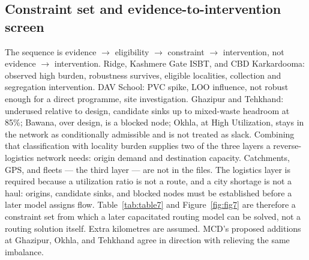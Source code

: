 \documentclass[12pt,a4paper]{article}
\begin{document}
\subsection{Constraint set and evidence-to-intervention screen}
\label{sec:res-routing}

The sequence is evidence $\rightarrow$ eligibility $\rightarrow$ constraint $\rightarrow$ intervention, not evidence $\rightarrow$ intervention. Ridge, Kashmere Gate ISBT, and CBD Karkardooma: observed high burden, robustness survives, eligible localities, collection and segregation intervention. DAV School: PVC spike, LOO influence, not robust enough for a direct programme, site investigation. Ghazipur and Tehkhand: underused relative to design, candidate sinks up to mixed-waste headroom at 85\%; Bawana, over design, is a blocked node; Okhla, at High Utilization, stays in the network as conditionally admissible and is not treated as slack. Combining that classification with locality burden supplies two of the three layers a reverse-logistics network needs: origin demand and destination capacity. Catchments, GPS, and fleets --- the third layer --- are not in the files. The logistics layer is required because a utilization ratio is not a route, and a city shortage is not a haul: origins, candidate sinks, and blocked nodes must be established before a later model assigns flow. Table~\ref{tab:table7} and Figure~\ref{fig:fig7} are therefore a constraint set from which a later capacitated routing model can be solved, not a routing solution itself. Extra kilometres are assumed. MCD's proposed additions at Ghazipur, Okhla, and Tehkhand \citep{nie_mcd_four_plants_2025,toi_tehkhand_expansion_2026,nie_processing_gap_2026} agree in direction with relieving the same imbalance.
\end{document}
